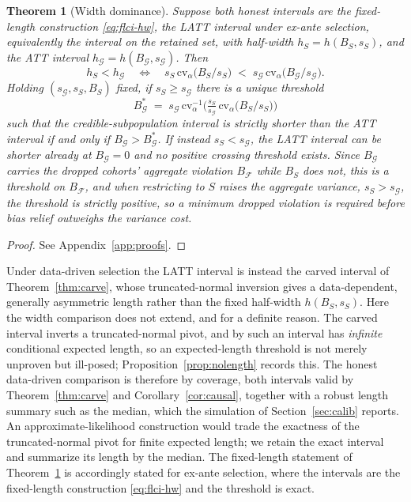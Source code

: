 \documentclass[12pt]{article}
\newtheorem{theorem}{Theorem}
\theoremstyle{remark}
\begin{document}
\begin{theorem}[Width dominance]\label{thm:width}
Suppose both honest intervals are the fixed-length construction \eqref{eq:flci-hw}, the LATT interval under
ex-ante selection, equivalently the \citet{rambachan2023} interval on the retained set, with half-width
$h_S=h(B_S,s_S)$, and the ATT interval $h_{\mathcal G}=h(B_{\mathcal G},s_{\mathcal G})$. Then
\[
h_S<h_{\mathcal G}\quad\Longleftrightarrow\quad
s_S\,\mathrm{cv}_\alpha\!\big(B_S/s_S\big)\;<\;
s_{\mathcal G}\,\mathrm{cv}_\alpha\!\big(B_{\mathcal G}/s_{\mathcal G}\big).
\]
Holding $(s_{\mathcal G},s_S,B_S)$ fixed, if $s_S\ge s_{\mathcal G}$ there is a unique threshold
\[
B_{\mathcal G}^\ast\;=\;s_{\mathcal G}\,\mathrm{cv}_\alpha^{-1}\!\Big(\tfrac{s_S}{s_{\mathcal G}}\,
\mathrm{cv}_\alpha\!\big(B_S/s_S\big)\Big)
\]
such that the credible-subpopulation interval is strictly shorter than the ATT interval if and
only if $B_{\mathcal G}>B_{\mathcal G}^\ast$. If instead $s_S<s_{\mathcal G}$, the LATT interval can be
shorter already at $B_{\mathcal G}=0$ and no positive crossing threshold exists. Since $B_{\mathcal G}$
carries the dropped cohorts' aggregate violation $B_{\mathcal F}$ while $B_S$ does not, this is a threshold
on $B_{\mathcal F}$, and when restricting to $S$ raises the aggregate variance,
$s_S>s_{\mathcal G}$, the threshold is strictly positive, so a minimum dropped violation is
required before bias relief outweighs the variance cost.
\end{theorem}

\begin{proof}
See Appendix~\ref{app:proofs}.
\end{proof}

Under data-driven selection the LATT interval is instead the carved interval of Theorem~\ref{thm:carve},
whose truncated-normal inversion gives a data-dependent, generally asymmetric length rather than the
fixed half-width $h(B_S,s_S)$. Here the width comparison does not extend, and for a definite reason. The
carved interval inverts a truncated-normal pivot, and by \citet{kivaranovicleeb2021} such an interval has
\emph{infinite} conditional expected length, so an expected-length threshold is not merely unproven but
ill-posed; Proposition~\ref{prop:nolength} records this. The honest data-driven comparison is therefore by
coverage, both intervals valid by Theorem~\ref{thm:carve} and Corollary~\ref{cor:causal}, together with a
robust length summary such as the median, which the simulation of Section~\ref{sec:calib} reports. An
approximate-likelihood construction \citep{panigrahi2023} would trade the exactness of the truncated-normal
pivot for finite expected length; we retain the exact interval and summarize its length by the median. The
fixed-length statement of Theorem~\ref{thm:width} is accordingly stated for ex-ante selection, where the
intervals are the fixed-length construction \eqref{eq:flci-hw} and the threshold is exact.
\end{document}
